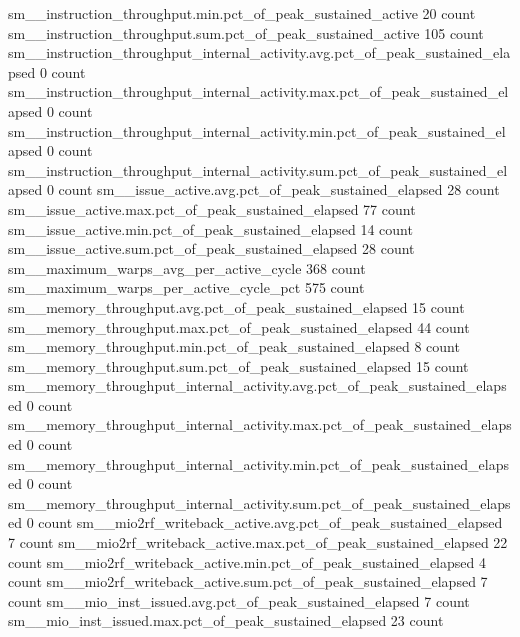 sm__instruction_throughput.min.pct_of_peak_sustained_active                                   20 count
sm__instruction_throughput.sum.pct_of_peak_sustained_active                                  105 count
sm__instruction_throughput_internal_activity.avg.pct_of_peak_sustained_elapsed                 0 count
sm__instruction_throughput_internal_activity.max.pct_of_peak_sustained_elapsed                 0 count
sm__instruction_throughput_internal_activity.min.pct_of_peak_sustained_elapsed                 0 count
sm__instruction_throughput_internal_activity.sum.pct_of_peak_sustained_elapsed                 0 count
sm__issue_active.avg.pct_of_peak_sustained_elapsed                                            28 count
sm__issue_active.max.pct_of_peak_sustained_elapsed                                            77 count
sm__issue_active.min.pct_of_peak_sustained_elapsed                                            14 count
sm__issue_active.sum.pct_of_peak_sustained_elapsed                                            28 count
sm__maximum_warps_avg_per_active_cycle                                                       368 count
sm__maximum_warps_per_active_cycle_pct                                                       575 count
sm__memory_throughput.avg.pct_of_peak_sustained_elapsed                                       15 count
sm__memory_throughput.max.pct_of_peak_sustained_elapsed                                       44 count
sm__memory_throughput.min.pct_of_peak_sustained_elapsed                                        8 count
sm__memory_throughput.sum.pct_of_peak_sustained_elapsed                                       15 count
sm__memory_throughput_internal_activity.avg.pct_of_peak_sustained_elapsed                      0 count
sm__memory_throughput_internal_activity.max.pct_of_peak_sustained_elapsed                      0 count
sm__memory_throughput_internal_activity.min.pct_of_peak_sustained_elapsed                      0 count
sm__memory_throughput_internal_activity.sum.pct_of_peak_sustained_elapsed                      0 count
sm__mio2rf_writeback_active.avg.pct_of_peak_sustained_elapsed                                  7 count
sm__mio2rf_writeback_active.max.pct_of_peak_sustained_elapsed                                 22 count
sm__mio2rf_writeback_active.min.pct_of_peak_sustained_elapsed                                  4 count
sm__mio2rf_writeback_active.sum.pct_of_peak_sustained_elapsed                                  7 count
sm__mio_inst_issued.avg.pct_of_peak_sustained_elapsed                                          7 count
sm__mio_inst_issued.max.pct_of_peak_sustained_elapsed                                         23 count
